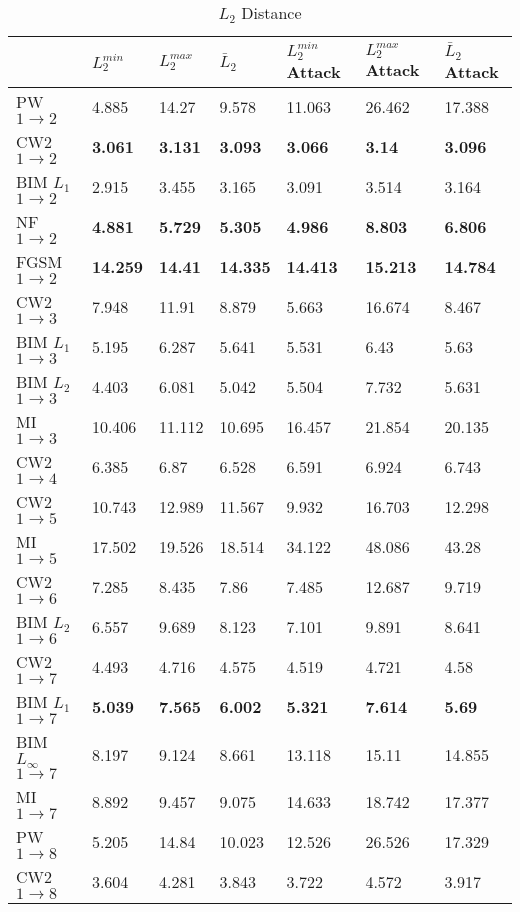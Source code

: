 \documentclass[12pt]{article}
\begin{document}
%
\begin{table}[t]
\caption{$L_2$ Distance}
\label{tab:L2}
\begin{center}
{\footnotesize  
\begin{tabular}{|l|lll|lll|} \hline
  &$L_2^{min}$ & $L_2^{max}$  &  $\bar{L}_2$ 
  &$L_2^{min}$ Attack& $L_2^{max}$ Attack & $\bar{L}_2$ Attack\\\hline
PW $1\to 2$ & 4.885 & 14.27 & 9.578 & 11.063 & 26.462 & 17.388\\   
CW2 $1\to 2$ & {\bf 3.061} & {\bf 3.131} & {\bf 3.093} & {\bf 3.066} &
{\bf 3.14} & {\bf 3.096} \\
BIM $L_1$  $1\to 2$ & 2.915 & 3.455 & 3.165 & 3.091 & 3.514 & 3.164\\
NF   $1\to 2$ & {\bf 4.881} & {\bf 5.729} & {\bf 5.305} & {\bf 4.986}
& {\bf 8.803} &	{\bf 6.806}\\
FGSM  $1\to 2$& {\bf 14.259} & {\bf 14.41} &{\bf 14.335}&{\bf 14.413}&
{\bf 15.213}&	{\bf 14.784} \\\hline
CW2  $1\to 3$& 7.948&	11.91&	8.879&	5.663&	16.674&	8.467 \\  
BIM $L_1$  $1\to 3$& 5.195&	6.287&	5.641&	5.531&	6.43&	5.63\\
BIM $L_2$  $1\to 3$&4.403&	6.081&	5.042&	5.504&	7.732&	5.631 \\
MI  $1\to 3$& 10.406&	11.112&	10.695&	16.457&	21.854&	20.135 \\\hline
CW2  $1\to 4$&6.385&	6.87&	6.528&	6.591&	6.924&	6.743 \\\hline
CW2  $1\to 5$ &10.743&	12.989&	11.567&	9.932&	16.703&	12.298 \\
MI  $1\to 5$& 17.502&	19.526&	18.514&	34.122&	48.086&	43.28 \\\hline
CW2  $1\to 6$&7.285&	8.435&	7.86&	7.485&	12.687&	9.719  \\
BIM $L_2$  $1\to 6$& 6.557&9.689&8.123&	7.101&	9.891&	8.641 \\\hline
CW2  $1\to 7$& 4.493&	4.716&	4.575&	4.519&	4.721&	4.58 \\
BIM $L_1$  $1\to 7$& {\bf 5.039}&{\bf 7.565}&{\bf 6.002}&
{\bf  5.321}&{\bf 7.614}&{\bf 5.69}\\
BIM $L_{\infty}$  $1\to 7$&8.197&	9.124&	8.661&	13.118&	15.11&	14.855 \\
MI  $1\to 7$& 8.892&	9.457&	9.075&	14.633&	18.742&	17.377\\\hline
PW  $1\to 8$& 5.205&	14.84&	10.023&	12.526&	26.526&	17.329\\
CW2  $1\to 8$& 3.604&	4.281&	3.843&	3.722&	4.572&	3.917\\

\end{tabular}}
\end{center}
\end{table}
\end{document}
